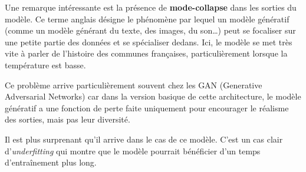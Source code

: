Une remarque intéressante est la présence de \textbf{mode-collapse} dans
les sorties du modèle. Ce terme anglais désigne le phénomène par lequel
un modèle génératif (comme un modèle générant du texte, des images, du
son\ldots{}) peut se focaliser sur une petite partie des données et se
spécialiser dedans. Ici, le modèle se met très vite à parler de
l'histoire des communes françaises, particulièrement lorsque la
température est basse.

Ce problème arrive particulièrement souvent chez les GAN (Generative
Adversarial Networks) car dans la version basique de cette architecture,
le modèle génératif a une fonction de perte faite uniquement pour
encourager le réalisme des sorties, mais pas leur diversité.

Il est plus surprenant qu'il arrive dans le cas de ce modèle. C'est un
cas clair d'\emph{underfitting} qui montre que le modèle pourrait
bénéficier d'un temps d'entraînement plus long.
